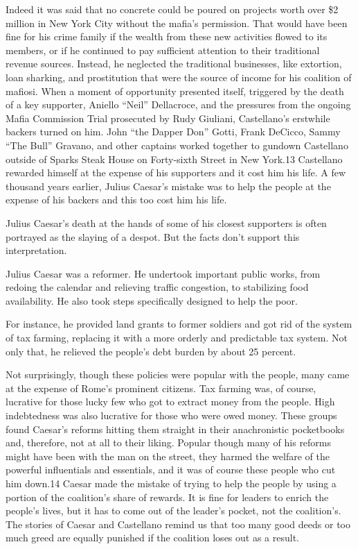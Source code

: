 \documentclass[10pt]{article}
\begin{document}
{\large Indeed it was said that no concrete could be poured on projects worth
over \$2 million in New York City without the mafia's permission. That would have
been fine for his crime family if the wealth from these new activities flowed to
its members, or if he continued to pay sufficient attention to their traditional
revenue sources. Instead, he neglected the traditional businesses, like
extortion, loan sharking, and prostitution that were the source of income for his
coalition of mafiosi. When a moment of opportunity presented itself, triggered by
the death of a key supporter, Aniello ``Neil'' Dellacroce, and the pressures from
the ongoing Mafia Commission Trial prosecuted by Rudy Giuliani, Castellano's
erstwhile backers turned on him. John ``the Dapper Don'' Gotti, Frank DeCicco,
Sammy ``The Bull'' Gravano, and other captains worked together to gundown
Castellano outside of Sparks Steak House on Forty-sixth Street in New York.13
Castellano rewarded himself at the expense of his supporters and it cost him his
life. A few thousand years earlier, Julius Caesar's mistake was to help the
people at the expense of his backers and this too cost him his life.}

{\large Julius Caesar's death at the hands of some of his closest supporters is
often portrayed as the slaying of a despot. But the facts don't support this
interpretation.}

{\large Julius Caesar was a reformer. He undertook important public works, from
redoing the calendar and relieving traffic congestion, to stabilizing food
availability. He also took steps specifically designed to help the poor.}

{\large For instance, he provided land grants to former soldiers and got rid of
the system of tax farming, replacing it with a more orderly and predictable tax
system. Not only that, he relieved the people's debt burden by about 25 percent.}

{\large Not surprisingly, though these policies were popular with the people,
many came at the expense of Rome's prominent citizens. Tax farming was, of
course, lucrative for those lucky few who got to extract money from the people.
High indebtedness was also lucrative for those who were owed money. These groups
found Caesar's reforms hitting them straight in their anachronistic pocketbooks
and, therefore, not at all to their liking. Popular though many of his reforms
might have been with the man on the street, they harmed the welfare of the
powerful influentials and essentials, and it was of course these people who cut
him down.14 Caesar made the mistake of trying to help the people by using a
portion of the coalition's share of rewards. It is fine for leaders to enrich the
people's lives, but it has to come out of the leader's pocket, not the
coalition's. The stories of Caesar and Castellano remind us that too many good
deeds or too much greed are equally punished if the coalition loses out as a
result.}
\end{document}
